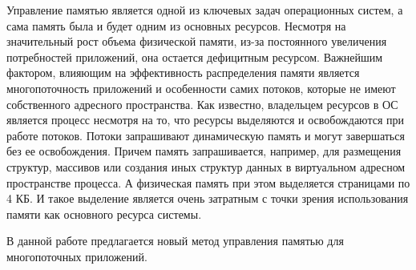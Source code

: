 \Introduction

Управление памятью является одной из ключевых задач операционных систем, а сама память была и будет одним из основных ресурсов. Несмотря на значительный рост объема физической памяти, из-за постоянного увеличения потребностей приложений, она остается дефицитным ресурсом. Важнейшим фактором, влияющим на эффективность распределения памяти является многопоточность приложений и особенности самих потоков, которые не имеют собственного адресного пространства. Как известно, владельцем ресурсов в ОС является процесс несмотря на то, что ресурсы выделяются и освобождаются при работе потоков. Потоки запрашивают динамическую память и могут завершаться без ее освобождения. Причем память запрашивается, например,  для размещения структур, массивов или создания иных структур данных в виртуальном адресном пространстве процесса. А физическая память при этом выделяется страницами по 4 КБ. И такое выделение является очень затратным с точки зрения использования памяти как основного ресурса системы.\cite{os-concepts}

В данной работе предлагается новый метод управления памятью для многопоточных приложений.
